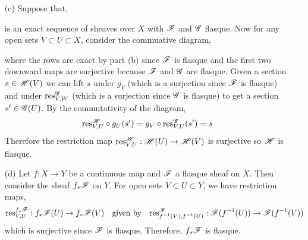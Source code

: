 \documentclass[12pt]{article}
\begin{document}
\begin{enumerate}
\item[(c)] Suppose that,
\begin{center}
\end{center}
is an exact sequence of sheaves over $X$ with $\mathscr{F}$ and $\mathscr{G}$ flasque. Now for any open sets $V \subset U \subset X$, consider the commuative diagram,
\begin{center}
\end{center}
where the rows are exact by part (b) since $\mathscr{F}$ is flasque and the first two downward maps are surjective because $\mathscr{F}$ and $\mathscr{G}$ are flasque. Given a section $s \in \mathscr{H}(V)$ we can lift $s$ under $g_V$ (which is a surjection since $\mathscr{F}$ is flasque) and under $\mathrm{res}^{\mathscr{G}}_{V,W}$ (which is a surjection since $\mathscr{G}$ is flasque) to get a section $s' \in \mathscr{G}(U)$. By the commutativity of the diagram,
\[ \mathrm{res}^{\mathscr{H}}_{V, U} \circ g_U(s') = g_V \circ \mathrm{res}^{\mathscr{G}}_{V,U}(s') = s \]
Therefore the restriction map $\mathrm{res}^{\mathscr{H}}_{V, U} : \mathscr{H}(U) \to \mathscr{H}(V)$ is surjective so $\mathscr{H}$ is flasque. 

\item[(d)] Let $f : X \to Y$ be a continuous map and $\mathscr{F}$ a flasque sheaf on $X$. Then consider the sheaf $f_* \mathscr{F}$ on $Y$. For open sets $V \subset U \subset Y$, we have restriction maps,
\[ \mathrm{res}^{f_* \mathscr{F}}_{V,U} : f_* \mathscr{F}(U) \to f_* \mathscr{F}(V) \quad \text{given by} \quad \mathrm{res}^{\mathscr{F}}_{f^{-1}(V), f^{-1}(U)} : \mathscr{F}(f^{-1}(U)) \to \mathscr{F}(f^{-1}(V)) \]
which is surjective since $\mathscr{F}$ is flasque. Therefore, $f_* \mathscr{F}$ is flasque. 


\end{enumerate}
\end{document}
